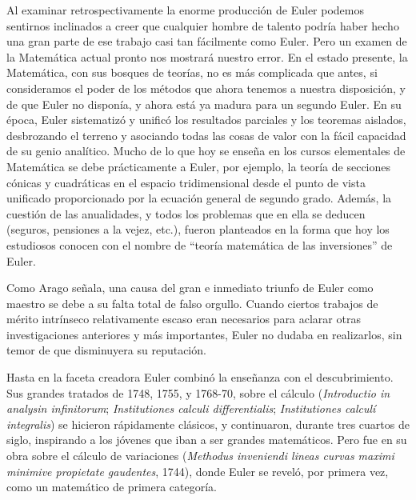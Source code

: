 \documentclass[a4paper, 12pt]{article}
\begin{document}
Al examinar retrospectivamente la enorme producción de Euler podemos sentirnos inclinados a creer que cualquier hombre de talento podría haber hecho una gran parte de ese trabajo casi tan fácilmente como Euler. Pero un examen de la Matemática actual pronto nos mostrará nuestro error. En el estado presente, la Matemática, con sus bosques de teorías, no es más complicada que antes, si consideramos el poder de los métodos que ahora tenemos a nuestra disposición, y de que Euler no disponía, y ahora está ya madura para un segundo Euler. En su época, Euler sistematizó y unificó los resultados parciales y los teoremas aislados, desbrozando el terreno y asociando todas las cosas de valor con la fácil capacidad de su genio analítico. Mucho de lo que hoy se enseña en los cursos elementales de Matemática se debe prácticamente a Euler, por ejemplo, la teoría de secciones cónicas y cuadráticas en el espacio tridimensional desde el punto de vista unificado proporcionado por la ecuación general de segundo grado. Además, la cuestión de las anualidades, y todos los problemas que en ella se deducen (seguros, pensiones a la vejez, etc.), fueron planteados en la forma que hoy los estudiosos conocen con el nombre de ``teoría matemática de las inversiones'' de Euler.

Como Arago señala, una causa del gran e inmediato triunfo de Euler como maestro se debe a su falta total de falso orgullo. Cuando ciertos trabajos de mérito intrínseco relativamente escaso eran necesarios para aclarar otras investigaciones anteriores y más importantes, Euler no dudaba en realizarlos, sin temor de que disminuyera su reputación.

Hasta en la faceta creadora Euler combinó la enseñanza con el descubrimiento. Sus grandes tratados de 1748, 1755, y 1768-70, sobre el cálculo ({\it Introductio in analysin infinitorum}; {\it Institutiones calculi differentialis}; {\it Institutiones calculí integralis}) se hicieron rápidamente clásicos, y continuaron, durante tres cuartos de siglo, inspirando a los jóvenes que iban a ser grandes matemáticos. Pero fue en su obra sobre el cálculo de variaciones ({\it Methodus inveniendi lineas curvas maximi minimive propietate gaudentes}, 1744), donde Euler se reveló, por primera vez, como un matemático de primera categoría. 
\end{document}
